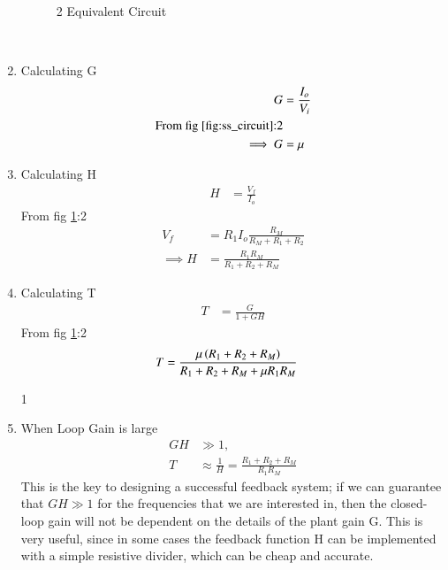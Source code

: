 \begin{enumerate}[label=\thesubsection.\arabic*.,ref=\thesubsection.\theenumi]
\begin{figure}[!ht]
	\begin{center}
		\resizebox{\columnwidth}{!}{}
	\end{center}
\caption{2 Equivalent Circuit}
\label{fig:ss_circuit}
\end{figure}\\
\item
Calculating G\\
\solution
\begin{align}
G &= \frac{I_{o}}{V_{i}} \label{eq:G}\\
\text{From fig \ref{fig:ss_circuit}:2}\\
\implies G&= \mu
\end{align}
\item
Calculating H\\
\solution
\begin{align}
H &= \frac{V_{f}}{I_{o}} \label{eq:H}
\end{align}
From fig \ref{fig:ss_circuit}:2\\
\begin{align}
V_{f}&=R_{1}I_{o}\frac{R_M}{R_M+R_1+R_2}\\
\implies
H &= \frac{R_1R_M}{R_1+R_2+R_M}
\end{align}
\item
Calculating T\\
\solution
\begin{align}
T &= \frac{G}{1+GH} \label{eq:T}
\end{align}
From fig \ref{fig:ss_circuit}:2
\begin{align}
T&= \frac{\mu \left(R_1+R_2+R_M\right)}{R_1+R_2+R_M+ \mu R_1R_M}
\end{align}


\begin{table}[!ht]
\centering

\caption{1}
\label{table: Input_Table}
\end{table}


\item When Loop Gain is large\\
\solution
\begin{align}
GH &\gg 1,
 \\
T &\approx \frac{1}{H}  = \frac{R_1+R_2+R_M}{R_1R_M} 
\end{align}
This is the key to designing a successful feedback system; if we can guarantee that $GH \gg 1$ for the frequencies that we are interested in, then the closed-loop gain will not be dependent on the details of the plant gain G. This is very useful, since in some cases the feedback function H can be implemented with a simple resistive divider, which can be cheap and accurate.

\end{enumerate}
